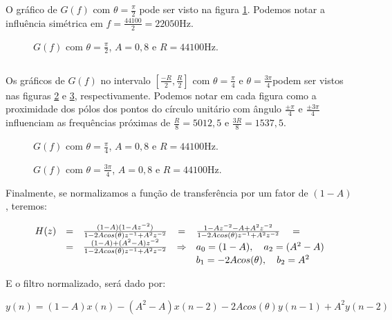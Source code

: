 O gráfico de $G(f)$ com $\theta = \frac{\pi}{2}$ pode ser visto na figura \ref{fig:4c}. Podemos notar a influência simétrica em $f = \frac{44100}{2} = 22050$Hz.

\begin{figure}
  \caption{\small{$G(f)$ com $\theta = \frac{\pi}{2}$, $A = 0,8$ e $R = 44100$Hz.}}
  \label{fig:4c}
\end{figure}

\subsection{}

Os gráficos de $G(f)$ no intervalo $[\frac{-R}{2},\frac{R}{2}]$ com $\theta = \frac{\pi}{4}$ e $\theta = \frac{3\pi}{4}$podem ser vistos nas figuras \ref{fig:4d-1} e \ref{fig:4d-2}, respectivamente. Podemos notar em cada figura como a proximidade dos pólos dos pontos do círculo unitário com ângulo $\frac{\pm\pi}{4}$ e $\frac{\pm3\pi}{4}$ influenciam as frequências próximas de $\frac{R}{8} = 5012,5$ e $\frac{3R}{8} = 1537,5$. 

\begin{figure}
  \caption{\small{$G(f)$ com $\theta = \frac{\pi}{4}$, $A = 0,8$ e $R = 44100$Hz.}}
  \label{fig:4d-1}
\end{figure}

\begin{figure}
  \caption{\small{$G(f)$ com $\theta = \frac{3\pi}{4}$, $A = 0,8$ e $R = 44100$Hz.}}
  \label{fig:4d-2}
\end{figure}

Finalmente, se normalizamos a função de transferência por um fator de $(1-A)$, teremos:

\[\displaystyle
\begin{array}{l c l c l}
  H(z) & = & \frac{(1-A) (1-Az^{-2})}{1-2Acos(\theta)z^{-1}+A^2 z^{-2}}  & = & \frac{1 - Az^{-2}-A+A^2z^{-2}}{1-2Acos(\theta)z^{-1}+A^2 z^{-2}} \quad = \\
       & = & \frac{(1-A) + (A^2 - A)z^{-2}}{1-2Acos(\theta)z^{-1}+A^2 z^{-2}}  &\Rightarrow & a_0 = (1-A), \quad a_2 = (A^2 - A) \\
       & & & & b_1 = -2Acos(\theta), \quad b_2 = A^2
\end{array}
\]

E o filtro normalizado, será dado por:

\begin{equation}\displaystyle
  y(n) = (1-A)x(n) - (A^2 - A)x(n-2) -2Acos(\theta)y(n-1) + A^2y(n-2)
\end{equation}

